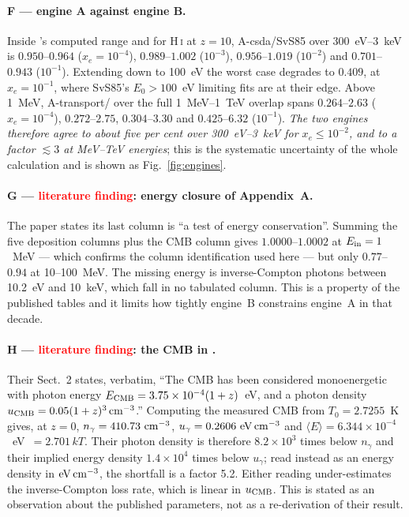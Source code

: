\documentclass[11pt,a4paper]{article}
\newcommand{\flag}[1]{\textbf{\textcolor{red}{#1}}}
\begin{document}
\paragraph{F --- engine A against engine B.}
Inside \citet{ShullVanSteenberg1985}'s computed range and for H\,\textsc{i}
at $z=10$, A-csda/SvS85 over 300~eV--3~keV is
$0.950$--$0.964$ ($x_e=10^{-4}$),
$0.989$--$1.002$ ($10^{-3}$),
$0.956$--$1.019$ ($10^{-2}$) and
$0.701$--$0.943$ ($10^{-1}$).
Extending down to 100~eV the worst case degrades to $0.409$, at
$x_e=10^{-1}$, where SvS85's $E_0>100$~eV limiting fits are at their edge.
Above 1~MeV, A-transport/\citet{Valdes2010} over the full 1~MeV--1~TeV overlap
spans $0.264$--$2.63$ ($x_e=10^{-4}$), $0.272$--$2.75$, $0.304$--$3.30$ and
$0.425$--$6.32$ ($10^{-1}$).
\emph{The two engines therefore agree to about five per cent over
300~eV--3~keV for $x_e\le10^{-2}$, and to a factor $\lesssim3$ at MeV--TeV
energies}; this is the systematic uncertainty of the whole calculation and is
shown as Fig.~\ref{fig:engines}.

\paragraph{G --- \flag{literature finding}: energy closure of
\citet{Valdes2010} Appendix~A.}
The paper states its last column is ``a test of energy conservation''.
Summing the five deposition columns plus the CMB column gives
$1.0000$--$1.0002$ at $E_{\rm in}=1$~MeV --- which confirms the column
identification used here --- but only $0.77$--$0.94$ at 10--100~MeV.  The
missing energy is inverse-Compton photons between 10.2~eV and 10~keV, which
fall in no tabulated column.  This is a property of the published tables and
it limits how tightly engine~B constrains engine~A in that decade.

\paragraph{H --- \flag{literature finding}: the CMB in \citet{Tueros2014}.}
Their Sect.~2 states, verbatim, ``The CMB has been considered monoenergetic
with photon energy $E_{\rm CMB} = 3.75\times10^{-4}(1+z)$~eV, and a photon
density $u_{\rm CMB} = 0.05(1+z)^3\,{\rm cm^{-3}}$.''  Computing the measured
CMB from $T_0 = 2.7255$~K \citep{Fixsen2009} gives, at $z=0$,
$n_\gamma = 410.73\ {\rm cm^{-3}}$,
$u_\gamma = 0.2606\ {\rm eV\,cm^{-3}}$ and
$\langle E\rangle = 6.344\times10^{-4}$~eV~$=2.701\,kT$.  Their photon density
is therefore $8.2\times10^{3}$ times below $n_\gamma$ and their implied energy
density $1.4\times10^{4}$ times below $u_\gamma$; read instead as an energy
density in ${\rm eV\,cm^{-3}}$, the shortfall is a factor 5.2.  Either reading
under-estimates the inverse-Compton loss rate, which is linear in
$u_{\rm CMB}$.  This is stated as an observation about the published
parameters, not as a re-derivation of their result.
\end{document}
